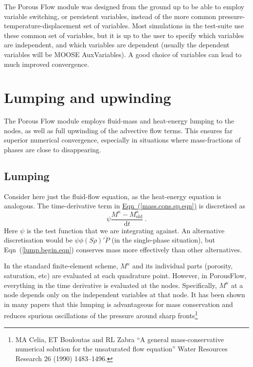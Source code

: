 \documentclass[12pt]{report}
\def\species{\kappa}
\def\d{\mathrm{d}}
\begin{document}
The Porous Flow module was designed from the ground up to be able to
employ variable switching, or persistent variables, instead of the
more common pressure-temperature-displacement set of variables.  Most
simulations in the test-suite use these common set of variables, but
it is up to the user to specify which variables are independent, and
which variables are dependent (usually the dependent variables will be
MOOSE AuxVariables).  A good choice of variables can lead to much
improved convergence.

\section{Lumping and upwinding}

The Porous Flow module employs fluid-mass and heat-energy lumping to
the nodes, as well as full upwinding of the advective flow terms.
This ensures far superior numerical convergence, especially in
situations where mass-fractions of phases are close to disappearing.

\subsection{Lumping}

Consider here just the fluid-flow equation, as the heat-energy
equation is analogous.  The time-derivative term in
\hyperref[mass.cons.sp.eqn]{Eqn~(\ref*{mass.cons.sp.eqn})} is discretised as
\begin{equation}
\psi \frac{M^{\species} - M^{\species}_{\mathrm{old}}}{\d t} \ .
\label{lump.begin.eqn}
\end{equation}
Here $\psi$ is the test function that we are integrating against.  An
alternative discretisation would be $\psi\phi(S\rho)'\dot{P}$ (in the
single-phase situation), but Eqn~(\ref{lump.begin.eqn}) conserves mass
more effectively than other alternatives.

In the standard finite-element scheme, $M^{\species}$ and its
individual parts (porosity, saturation, etc) are evaluated at each
quadrature point.  However, in PorousFlow, everything in the time
derivative is evaluated at the nodes.  Specifically, $M^{\species}$ at
a node depends only on the independent variables at that node.  It has
been shown in many papers that this lumping is advantageous for mass
conservation and reduces spurious oscillations of the pressure around
sharp fronts\footnote{MA Celia, ET Bouloutas and RL Zabra ``A general
  mass-conservative numerical solution for the unsaturated flow
  equation''  Water Resources Research 26 (1990) 1483--1496.}
\end{document}

